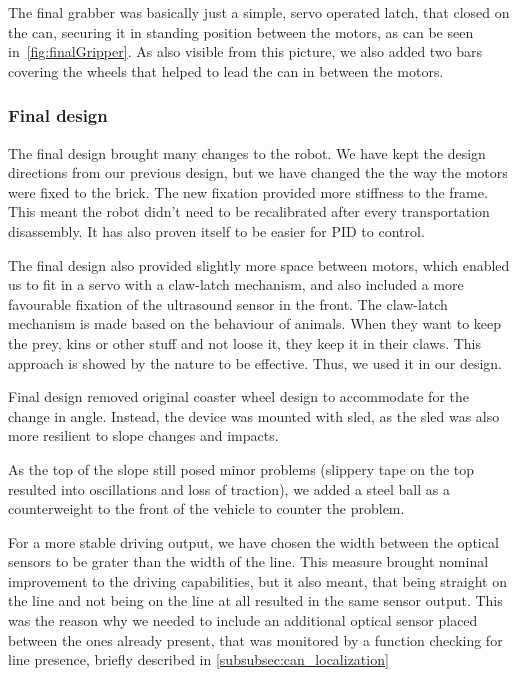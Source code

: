 \documentclass{article}
\begin{document}
The final grabber was basically just a simple, servo operated latch, that closed on the can, securing it in standing
position between the motors, as can be seen in~\ref{fig:finalGripper}. As also visible from this picture, we also added
two bars covering the wheels that helped to lead the can in between the motors.

\subsubsection{Final design}
\label{subsubsec:final_design}

The final design brought many changes to the robot. We have kept the design directions from our previous design, but
we have changed the the way the motors were fixed to the brick. The new fixation provided more stiffness to the frame.
This meant the robot didn't need to be recalibrated after every transportation disassembly. It has also proven itself
to be easier for PID to control.

The final design also provided slightly more space between motors, which enabled us to fit in a servo with a claw-latch
mechanism, and also included a more favourable fixation of the ultrasound sensor in the front. The claw-latch mechanism
is made based on the behaviour of animals. When they want to keep the prey, kins or other stuff and not loose it, they
keep it in their claws. This approach is showed by the nature to be effective. Thus, we used it in our design.

Final design removed original coaster wheel design to accommodate for the change in angle. Instead, the device was
mounted with sled, as the sled was also more resilient to slope changes and impacts.

As the top of the slope still posed minor problems (slippery tape on the top resulted into oscillations and loss of
traction), we added a steel ball as a counterweight to the front of the vehicle to counter the problem.

For a more stable driving output, we have chosen the width between the optical sensors to be grater than the width of
the line. This measure brought nominal improvement to the driving capabilities, but it also meant, that being straight
on the line and not being on the line at all resulted in the same sensor output. This was the reason why we needed to
include an additional optical sensor placed between the ones already present, that was monitored by a function checking
for line presence, briefly described in \ref{subsubsec:can_localization}
\end{document}
